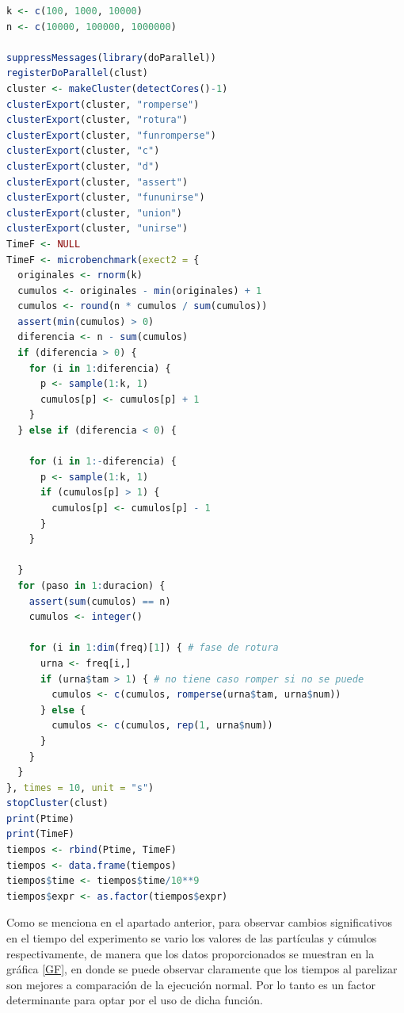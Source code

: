 \documentclass[12pt, letterpaper] {article}
\begin{document}
\begin{lstlisting}[language=R]
k <- c(100, 1000, 10000)
n <- c(10000, 100000, 1000000)

suppressMessages(library(doParallel))
registerDoParallel(clust)
cluster <- makeCluster(detectCores()-1) 
clusterExport(cluster, "romperse") 
clusterExport(cluster, "rotura") 
clusterExport(cluster, "funromperse") 
clusterExport(cluster, "c") 
clusterExport(cluster, "d") 
clusterExport(cluster, "assert") 
clusterExport(cluster, "fununirse") 
clusterExport(cluster, "union") 
clusterExport(cluster, "unirse") 
TimeF <- NULL
TimeF <- microbenchmark(exect2 = {
  originales <- rnorm(k)
  cumulos <- originales - min(originales) + 1
  cumulos <- round(n * cumulos / sum(cumulos))
  assert(min(cumulos) > 0)
  diferencia <- n - sum(cumulos)
  if (diferencia > 0) {
    for (i in 1:diferencia) {
      p <- sample(1:k, 1)
      cumulos[p] <- cumulos[p] + 1
    }
  } else if (diferencia < 0) {
    
    for (i in 1:-diferencia) {
      p <- sample(1:k, 1)
      if (cumulos[p] > 1) {
        cumulos[p] <- cumulos[p] - 1
      }
    }
    
  }
  for (paso in 1:duracion) {
    assert(sum(cumulos) == n)
    cumulos <- integer()
  
    for (i in 1:dim(freq)[1]) { # fase de rotura
      urna <- freq[i,]
      if (urna$tam > 1) { # no tiene caso romper si no se puede
        cumulos <- c(cumulos, romperse(urna$tam, urna$num))
      } else {
        cumulos <- c(cumulos, rep(1, urna$num))
      }
    }
  }
}, times = 10, unit = "s")
stopCluster(clust)
print(Ptime)
print(TimeF)
tiempos <- rbind(Ptime, TimeF)
tiempos <- data.frame(tiempos)
tiempos$time <- tiempos$time/10**9
tiempos$expr <- as.factor(tiempos$expr)
\end{lstlisting}

Como se menciona en el apartado anterior, para observar cambios significativos en el tiempo del experimento se vario los valores de las partículas y cúmulos respectivamente, de manera que los datos proporcionados se muestran en la gráfica \ref{GF}, en donde se puede observar claramente que los tiempos al parelizar son mejores a comparación de la ejecución normal. Por lo tanto es un factor determinante para optar por el uso de dicha función.
\end{document}

